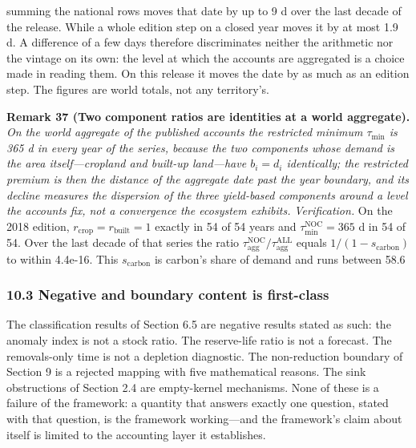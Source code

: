 \documentclass[11pt]{article}
\begin{document}
summing the national rows moves that date by up to 9 d over the last decade of the release. While a whole edition step on a closed year moves it by at most 1.9 d. A difference of a few days therefore discriminates neither the arithmetic nor the vintage on its own: the level at which the accounts are aggregated is a choice made in reading them. On this release it moves the date by as much as an edition step. The figures are world totals, not any territory's.


\textbf{Remark 37 (Two component ratios are identities at a world aggregate).} \emph{On the world aggregate of the published accounts the restricted minimum \(\tau_{\min}\) is 365 d in every year of the series, because the two components whose demand is the area itself---cropland and built-up land---have \(b_i = d_i\) identically; the restricted premium is then the distance of the aggregate date past the year boundary, and its decline measures the dispersion of the three yield-based components around a level the accounts fix, not a convergence the ecosystem exhibits.} \emph{Verification.} On the 2018 edition, \(r_{\mathrm{crop}} = r_{\mathrm{built}} = 1\) exactly in 54 of 54 years and \(\tau_{\min}^{\mathrm{NOC}} = 365\) d in 54 of 54. Over the last decade of that series the ratio \(\tau_{\mathrm{agg}}^{\mathrm{NOC}}/\tau_{\mathrm{agg}}^{\mathrm{ALL}}\) equals \(1/(1-s_{\mathrm{carbon}})\) to within 4.4e-16. This \(s_{\mathrm{carbon}}\) is carbon's share of demand and runs between 58.6%

\subsubsection{10.3 Negative and boundary content is
first-class}\label{negative-and-boundary-content-is-first-class}

The classification results of Section 6.5 are negative results stated as such: the anomaly index is not a stock ratio. The reserve-life ratio is not a forecast. The removals-only time is not a depletion diagnostic. The non-reduction boundary of Section 9 is a rejected mapping with five mathematical reasons. The sink obstructions of Section 2.4 are empty-kernel mechanisms. None of these is a failure of the framework: a quantity that answers exactly one question, stated with that question, is the framework working---and the framework's claim about itself is limited to the accounting layer it establishes.
\end{document}
